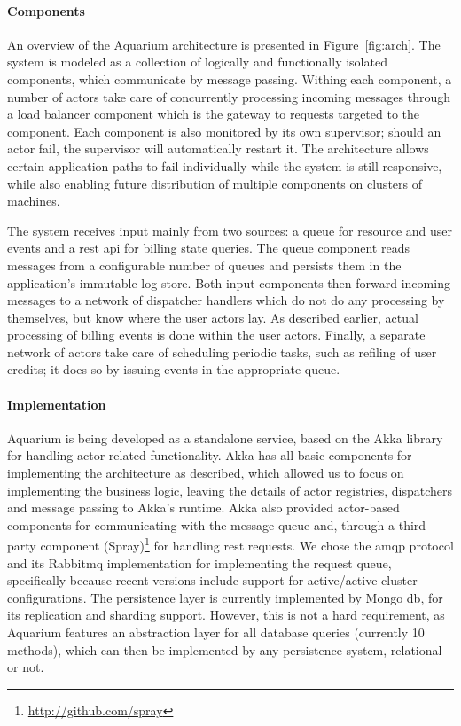 \paragraph{Components} An overview of the Aquarium architecture is presented in
Figure~\ref{fig:arch}.  The system is modeled as a collection of logically and
functionally isolated components, which communicate by message passing. Withing
each component, a number of actors take care of concurrently processing
incoming messages through a load balancer component which is the gateway to
requests targeted to the component. Each component is also monitored by its own
supervisor; should an actor fail, the supervisor will automatically restart it.
The architecture allows certain application paths to fail individually while
the system is still responsive, while also enabling future distribution of
multiple components on clusters of machines.

The system receives input mainly from two sources: a queue for resource and
user events and a {\sc rest api} for billing state queries. The queue component
reads messages from a configurable number of queues and persists them in the
application's immutable log store. Both input components then forward incoming
messages to a network of dispatcher handlers which do not do any processing by
themselves, but know where the user actors lay. As described earlier, actual
processing of billing events is done within the user actors. Finally, a
separate network of actors take care of scheduling periodic tasks, such as
refiling of user credits; it does so by issuing events in the appropriate
queue.

\paragraph{Implementation}

Aquarium is being developed as a standalone service, based on the Akka library
for handling actor related functionality. Akka has all basic components for
implementing the architecture as described, which allowed us to focus on
implementing the business logic, leaving the details of actor registries,
dispatchers and message passing to Akka's runtime. Akka also provided
actor-based components for communicating with the message queue and, through a
third party component (Spray)\footnote{\url{http://github.com/spray}} for
handling {\sc rest} requests.  We chose the {\sc amqp} protocol and its
Rabbit{\sc mq} implementation for implementing the request queue, specifically
because recent versions include support for active/active cluster
configurations. The persistence layer is currently implemented by Mongo{\sc
db}, for its replication and sharding support.  However, this is not a hard
requirement, as Aquarium features an abstraction layer for all database queries
(currently 10 methods), which can then be implemented by any persistence
system, relational or not.
